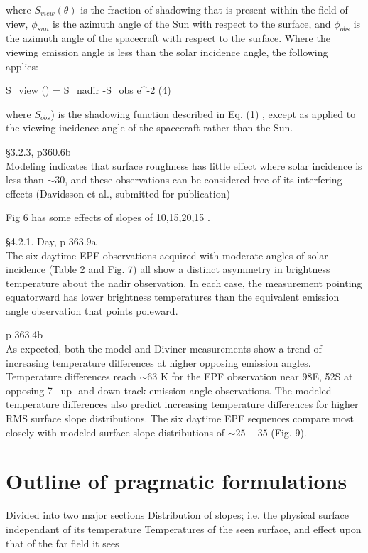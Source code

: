 \documentclass{article}
\begin{document}
where $S_{view} (\theta)$ is the fraction of shadowing that is present within
the field of view, $\phi_{sun}$ is the azimuth angle of the Sun with respect to
the surface, and $\phi_{obs}$ is the azimuth angle of the spacecraft with
respect to the surface. Where the viewing emission angle is less than the solar
incidence angle, the following applies:

\qb S_{view} (\theta) = S_{nadir} -S_{obs} \cdot e^{-2\tan{} } \qeq (4) \qe 

where $S_{obs}$) is the shadowing function described in Eq.  (1) , except as
applied to the viewing incidence angle of the spacecraft rather than the Sun.
 \eq

\S 3.2.3, p360.6b \\ \bq
Modeling indicates that surface roughness has little effect where solar
incidence is less than $\sim 30$\qd, and these observations can be considered
free of its interfering effects (Davidsson et al., submitted for publication) \eq

Fig 6 has some effects of slopes of 10,15,20,15 \qd.

\S 4.2.1. Day, p 363.9a \\ \bq 
The six daytime EPF observations acquired with moderate angles of
solar incidence (Table 2 and Fig. 7) all show a distinct asymmetry in
brightness temperature about the nadir observation.  In each case, the
measurement pointing equatorward has lower brightness temperatures than the
equivalent emission angle observation that points poleward. \eq

p 363.4b \\ \bq 
As expected, both the model and Diviner measurements show a trend of increasing
temperature differences at higher opposing emission angles. Temperature
differences reach $\sim 63$ K for the EPF observation near 98\qd E, 52\qd S at
opposing 7\qd~ up- and down-track emission angle observations. The modeled
temperature differences also predict increasing temperature differences for
higher RMS surface slope distributions. The six daytime EPF sequences compare
most closely with modeled surface slope distributions of $\sim 25 - 35 $ \qd
(Fig. 9). \eq

\section{Outline of pragmatic formulations}
Divided into two major sections
\qi Distribution of slopes; i.e. the physical surface independant of its temperature 
\qi Temperatures of the seen surface, and effect upon that of the far field it sees
\end{document}
